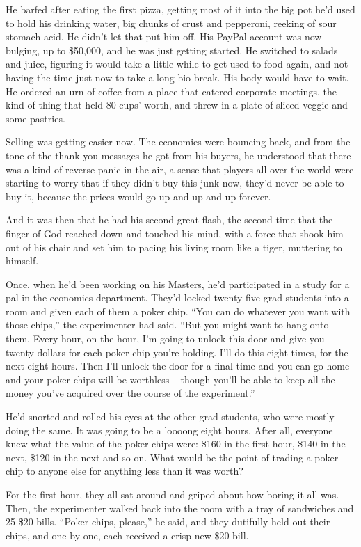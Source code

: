 He barfed after eating the first pizza, getting most of it into the
big pot he'd used to hold his drinking water, big chunks of crust
and pepperoni, reeking of sour stomach-acid. He didn't let that put
him off. His PayPal account was now bulging, up to \$50,000, and he
was just getting started. He switched to salads and juice, figuring
it would take a little while to get used to food again, and not
having the time just now to take a long bio-break. His body would
have to wait. He ordered an urn of coffee from a place that catered
corporate meetings, the kind of thing that held 80 cups' worth, and
threw in a plate of sliced veggie and some pastries.

Selling was getting easier now. The economies were bouncing back,
and from the tone of the thank-you messages he got from his buyers,
he understood that there was a kind of reverse-panic in the air, a
sense that players all over the world were starting to worry that
if they didn't buy this junk now, they'd never be able to buy it,
because the prices would go up and up and up forever.

And it was then that he had his second great flash, the second time
that the finger of God reached down and touched his mind, with a
force that shook him out of his chair and set him to pacing his
living room like a tiger, muttering to himself.

Once, when he'd been working on his Masters, he'd participated in a
study for a pal in the economics department. They'd locked twenty
five grad students into a room and given each of them a poker chip.
``You can do whatever you want with those chips,'' the experimenter
had said. ``But you might want to hang onto them. Every hour, on the
hour, I'm going to unlock this door and give you twenty dollars for
each poker chip you're holding. I'll do this eight times, for the
next eight hours. Then I'll unlock the door for a final time and
you can go home and your poker chips will be worthless -- though
you'll be able to keep all the money you've acquired over the
course of the experiment.''

He'd snorted and rolled his eyes at the other grad students, who
were mostly doing the same. It was going to be a loooong eight
hours. After all, everyone knew what the value of the poker chips
were: \$160 in the first hour, \$140 in the next, \$120 in the next
and so on. What would be the point of trading a poker chip to
anyone else for anything less than it was worth?

For the first hour, they all sat around and griped about how boring
it all was. Then, the experimenter walked back into the room with a
tray of sandwiches and 25 \$20 bills. ``Poker chips, please,'' he
said, and they dutifully held out their chips, and one by one, each
received a crisp new \$20 bill.

